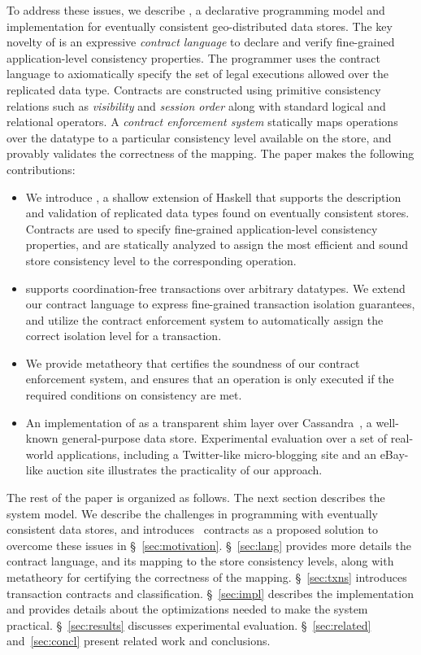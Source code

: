 To address these issues, we describe \name, a declarative programming model and
implementation for eventually consistent geo-distributed data stores. The key
novelty of \name is an expressive \emph{contract language} to declare and
verify fine-grained application-level consistency properties. The programmer
uses the contract language to axiomatically specify the set of legal executions
allowed over the replicated data type. Contracts are constructed using
primitive consistency relations such as \emph{visibility} and \emph{session
order} along with standard logical and relational operators. A \emph{contract
enforcement system} statically maps operations over the datatype to a
particular consistency level available on the store, and provably validates the
correctness of the mapping. The paper makes the following contributions:

\begin{itemize}
\setlength{\itemsep}{2pt}
\item We introduce \name, a shallow extension of Haskell that supports the
	description and validation of replicated data types found on eventually
	consistent stores. Contracts are used to specify fine-grained
	application-level consistency properties, and are statically analyzed to
	assign the most efficient and sound store consistency level to the
	corresponding operation.
\item \name supports coordination-free transactions over arbitrary datatypes.
	We extend our contract language to express fine-grained transaction isolation
	guarantees, and utilize the contract enforcement system to automatically
	assign the correct isolation level for a transaction.
\item We provide metatheory that certifies the soundness of our contract
	enforcement system, and ensures that an operation is only executed if the
	required conditions on consistency are met.
\item An implementation of \name as a transparent shim layer over
	Cassandra~\cite{Cassandra}, a well-known general-purpose data store.
	Experimental evaluation over a set of real-world applications, including a
	Twitter-like micro-blogging site and an eBay-like auction site illustrates
	the practicality of our approach.
\end{itemize}

The rest of the paper is organized as follows. The next section describes the
system model.  We describe the challenges in programming with eventually
consistent data stores, and introduces \name\ contracts as a proposed solution
to overcome these issues in \S~\ref{sec:motivation}. \S~\ref{sec:lang} provides
more details the contract language, and its mapping to the store consistency
levels, along with metatheory for certifying the correctness of the mapping.
\S~\ref{sec:txns} introduces transaction contracts and classification.
\S~\ref{sec:impl} describes the implementation and provides details about the
optimizations needed to make the system practical. \S~\ref{sec:results}
discusses experimental evaluation. \S~\ref{sec:related} and~\ref{sec:concl}
present related work and conclusions.
